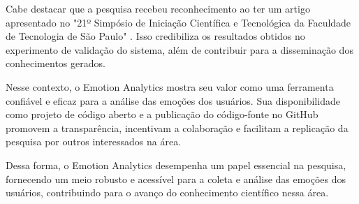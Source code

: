 Cabe destacar que a pesquisa recebeu reconhecimento ao ter um artigo apresentado no "21º Simpósio de Iniciação Científica e Tecnológica da Faculdade de Tecnologia de São Paulo" \cite{25}. Isso credibiliza os resultados obtidos no experimento de validação do sistema, além de contribuir para a disseminação dos conhecimentos gerados.

Nesse contexto, o Emotion Analytics mostra seu valor como uma ferramenta confiável e eficaz para a análise das emoções dos usuários. Sua disponibilidade como projeto de código aberto e a publicação do código-fonte no GitHub \cite{22}\cite{23} promovem a transparência, incentivam a colaboração e facilitam a replicação da pesquisa por outros interessados na área.

Dessa forma, o Emotion Analytics desempenha um papel essencial na pesquisa, fornecendo um meio robusto e acessível para a coleta e análise das emoções dos usuários, contribuindo para o avanço do conhecimento científico nessa área.
